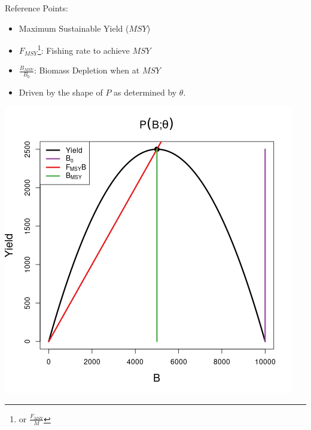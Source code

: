 \documentclass[ xcolor = pdftex, dvipsnames, table ]{beamer}
\begin{document}
%
\begin{frame}
\begin{minipage}[h!]{0.49\textwidth}
	Reference Points:
	\begin{itemize}
	\setlength{\itemsep}{5mm}
	\item Maximum Sustainable Yield ($MSY$)
	\item $F_{MSY}$\footnote[1]{or $\frac{F_{MSY}}{M}$}: Fishing rate to achieve $MSY$
	\item $\frac{B_{MSY}}{B_0}$: Biomass Depletion when at $MSY$
	\item Driven by the shape of $P$ as determined by $\theta$.
	\end{itemize}
\end{minipage}
\begin{minipage}[h!]{0.49\textwidth}
	\hspace{0.5cm}
	\includegraphics[width=\textwidth]{../../advance/plots/yieldRPplusP.png}
\end{minipage}
\end{frame}
\end{document}
